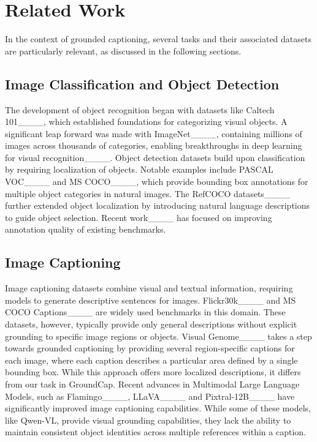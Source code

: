 \section{Related Work}
\label{sec:related-work}
    In the context of grounded captioning, several tasks and their associated datasets are particularly relevant, as discussed in
    the following sections.

    \subsection{Image Classification and Object Detection}\label{subsec:image-classification-and-object-detection}
    The development of object recognition began with datasets like Caltech 101____,
    which established foundations for categorizing visual objects.
    A significant leap forward was made with ImageNet____, containing millions of images across thousands of categories, enabling breakthroughs in deep learning for visual recognition____.
    Object detection datasets build upon classification by requiring localization of objects.
    Notable examples include PASCAL VOC____ and MS COCO____, which provide bounding
    box annotations for multiple object categories in natural images.
    The RefCOCO datasets____ further extended object localization
    by introducing natural language descriptions to guide object selection.
    Recent work____ has focused on improving annotation quality of existing benchmarks.

    \subsection{Image Captioning}\label{subsec:image-captioning}
    Image captioning datasets combine visual and textual information, requiring models to generate descriptive sentences for images.
    Flickr30k____ and MS COCO Captions____ are widely used benchmarks in this domain.
    These datasets, however, typically provide only general descriptions without explicit grounding to specific image regions or objects.
    Visual Genome____ takes a step towards grounded captioning by providing several region-specific
    captions for each image, where each caption describes a particular area defined by a single bounding box.
    While this approach offers more localized descriptions, it differs from our task in GroundCap.
    Recent advances in Multimodal Large Language Models, such as Flamingo____,
    LLaVA____ and Pixtral-12B____ have significantly improved image captioning capabilities.
    While some of these models, like Qwen-VL, provide visual grounding capabilities, they lack the ability to maintain
    consistent object identities across multiple references within a caption.


